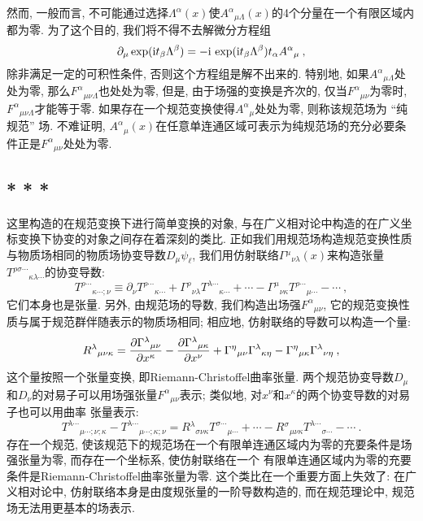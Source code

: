 然而, 一般而言, 不可能通过选择$\Lambda ^{\alpha }(x)$使${A^{\alpha }}_{\mu \Lambda }(x)$的4个分量在一个有限区域内都为零. 为了这个目的, 我们将不得不去解{}微分方程组\begin{equation}
\partial _{\mu }\exp (\mathrm{i} t_{\beta }\Lambda ^{\beta })=-\mathrm{i}\,\exp (\mathrm{i} t_{\beta
}\Lambda ^{\beta })t_{\alpha }{A^{\alpha }}_{\mu }\:,   \label{15.1.19}
\end{equation}%
除非满足一定的可积性条件, 否则这个方程组是解不出来的. 特别地, 如果${A^{\alpha }}_{\mu \Lambda }$处处为零, 那么${F^{\alpha }}_{\mu \nu \Lambda }$也处处为零, 但是, 由于场强的变换是齐次的, 仅当${F^{\alpha }}_{\mu \nu }$为零时, ${F^{\alpha }}%
_{\mu \nu \Lambda }$才能等于零. 如果存在一个规范变换使得${A^{\alpha }}_{\mu }$处处为零,
则称该规范场为 ``纯规范'' 场. 不难证明, ${A^{\alpha }}_{\mu }(x)$在任意单连通区域可表示为纯规范场的充分必要条件正是${F^{\alpha }}_{\mu \nu }$处处为零.\cite{6}

\subsection*{* * *}

这里构造的在规范变换下进行简单变换的对象, 与在广义相对论中构造的在广义坐标变换下协变的对象之间存在着深刻的类比. 
正如我们用规范场构造规范变换性质与物质场相同的物质场协变导数$D_{\mu }\psi _{\ell }$, 
我们用仿射联络${\Gamma }{^{\mu }}_{\nu \lambda }(x)$来构造张量${T^{\rho \sigma \cdots }}_{\kappa
\lambda \cdots }$的协变导数:%
\begin{equation*}
T^{\rho \cdots}{}_{\kappa\cdots;\nu}\equiv \partial_{\nu}T^{\rho \cdots}{}_{\kappa\cdots}+\Gamma^{\rho}{}_{\nu\lambda}
T^{\lambda\cdots}{}_{\kappa\cdots}+\cdots-\Gamma^{\mu}{}_{\nu\kappa}T^{\rho\cdots}{}_{\mu\cdots}-\cdots \:, 
\end{equation*}
它们本身也是张量. 另外, 由规范场的导数, 我们构造出场强${F^{\alpha }}_{\mu
\nu }$, 它的规范变换性质与属于规范群伴随表示的物质场相同; 相应地, 仿射联络的导数可以构造一个量:%
\[
R{^{\lambda }}_{\mu \nu \kappa }=\frac{\partial {\Gamma }{^{\lambda }}_{\mu
\nu }}{\partial x^{\kappa }}-\frac{\partial {\Gamma }{^{\lambda }}_{\mu
\kappa }}{\partial x^{\nu }}+{\Gamma }{^{\eta }}_{\mu \nu }{\Gamma }{%
^{\lambda }}_{\kappa \eta }-{\Gamma }{^{\eta }}_{\mu \kappa }{\Gamma }{%
^{\lambda }}_{\nu \eta }\:, 
\]%
这个量按照一个张量变换, 即Riemann-Christoffel曲率张量. 两个规范协变导数$D_{\mu }$%
和$D_{\nu }$的对易子可以用场强张量${F^{\alpha }}_{\mu \nu }$表示; 类似地, 对$x^{\nu }$和$x^{\kappa }$的两个协变导数的对易子也可以用曲率
张量表示:%
\[
{T^{\lambda \cdots }}_{\mu \cdots ;\nu ;\kappa }-{T^{\lambda \cdots }}_{\mu
\cdots ;\kappa ;\nu }=R{^{\lambda }}_{\sigma \nu \kappa }{T^{\sigma \cdots }}%
_{\mu \cdots }+\cdots -R{^{\sigma }}_{\mu \nu \kappa }{T^{\lambda \cdots }}%
_{\sigma \cdots }-\cdots \:. 
\]%
存在一个规范, 使该规范下的规范场在一个有限单连通区域内为零的充要条件是场强张量为零, 而存在一个坐标系, 使仿射联络在一个%
有限单连通区域内为零的充要条件是Riemann-Christoffel曲率张量为零. 这个类比在一个重要方面上失效了: 
在广义相对论中, 仿射联络本身是由度规张量的一阶导数构造的, 而在规范理论中, 规范场无法用更基本的场表示.



